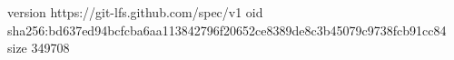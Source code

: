 version https://git-lfs.github.com/spec/v1
oid sha256:bd637ed94bcfcba6aa113842796f20652ce8389de8c3b45079c9738fcb91cc84
size 349708
